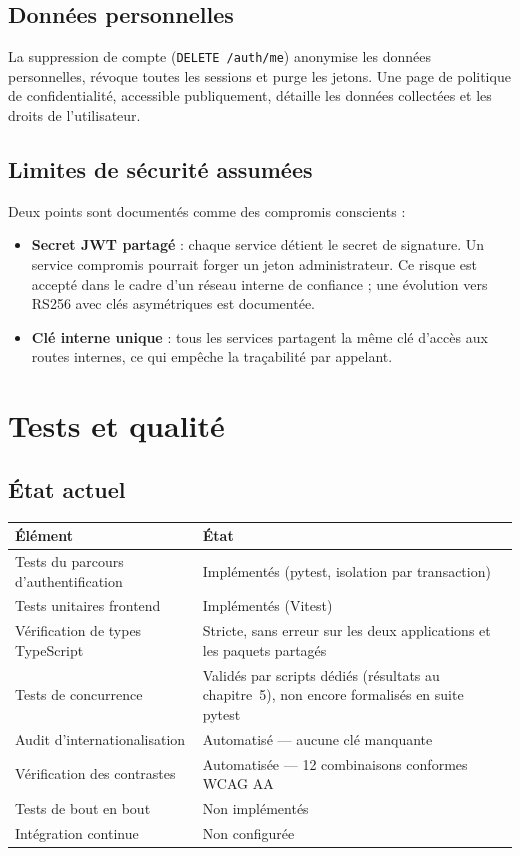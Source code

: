 \documentclass[11pt,a4paper]{report}
\begin{document}
\section{Données personnelles}

La suppression de compte (\texttt{DELETE /auth/me}) anonymise les données
personnelles, révoque toutes les sessions et purge les jetons. Une page de
politique de confidentialité, accessible publiquement, détaille les données
collectées et les droits de l'utilisateur.

\section{Limites de sécurité assumées}

Deux points sont documentés comme des compromis conscients :

\begin{itemize}
  \item \textbf{Secret JWT partagé} : chaque service détient le secret de
    signature. Un service compromis pourrait forger un jeton administrateur. Ce
    risque est accepté dans le cadre d'un réseau interne de confiance ; une
    évolution vers RS256 avec clés asymétriques est documentée.
  \item \textbf{Clé interne unique} : tous les services partagent la même clé
    d'accès aux routes internes, ce qui empêche la traçabilité par appelant.
\end{itemize}

\chapter{Tests et qualité}

\section{État actuel}

\begin{longtable}{@{}p{6.4cm}p{8cm}@{}}
\toprule
\textbf{Élément} & \textbf{État} \\
\midrule
\endhead
Tests du parcours d'authentification & Implémentés (pytest, isolation par
transaction) \\
\addlinespace
Tests unitaires frontend & Implémentés (Vitest) \\
\addlinespace
Vérification de types TypeScript & Stricte, sans erreur sur les deux
applications et les paquets partagés \\
\addlinespace
Tests de concurrence & Validés par scripts dédiés (résultats au chapitre~5),
non encore formalisés en suite pytest \\
\addlinespace
Audit d'internationalisation & Automatisé — aucune clé manquante \\
\addlinespace
Vérification des contrastes & Automatisée — 12 combinaisons conformes WCAG AA \\
\addlinespace
Tests de bout en bout & Non implémentés \\
\addlinespace
Intégration continue & Non configurée \\
\bottomrule
\end{longtable}
\end{document}

